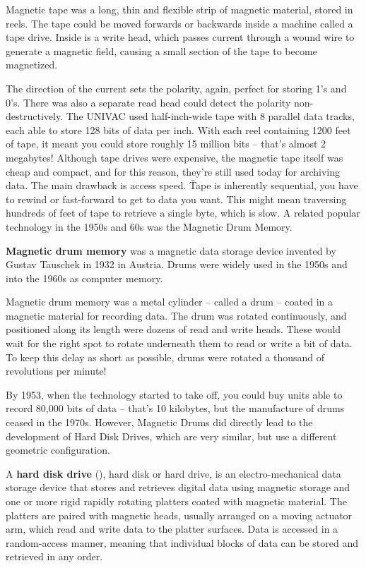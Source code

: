 Magnetic tape was a long, thin and flexible strip of magnetic material, stored in reels. The tape could be moved
forwards or backwards inside a machine called a tape drive. Inside is a write head, which passes current through a
wound wire to generate a magnetic field, causing a small section of the tape to become magnetized.


The direction of the current sets the polarity, again, perfect for storing 1's and 0's. There was also a separate
read head could detect the polarity non-destructively. The UNIVAC used half-inch-wide tape with 8 parallel data
tracks, each able to store 128 bits of data per inch. With each reel containing 1200 feet of tape, it meant you could
store roughly 15 million bits – that's almost 2 megabytes! Although tape drives were expensive, the magnetic tape
itself was cheap and compact, and for this reason, they're still used today for archiving data. The main drawback is
access speed. \v

Tape is inherently sequential, you have to rewind or fast-forward to get to data you want. This might mean traversing
hundreds of feet of tape to retrieve a single byte, which is slow. A related popular technology in the 1950s and 60s
was the Magnetic Drum Memory.

\textbf{Magnetic drum memory} was a magnetic data storage device invented by Gustav Tauschek in 1932 in Austria.
Drums were widely used in the 1950s and into the 1960s as computer memory.
\ed

Magnetic drum memory was a metal cylinder – called a drum – coated in a magnetic material for recording data. The
drum was rotated continuously, and positioned along its length were dozens of read and write heads. These would wait
for the right spot to rotate underneath them to read or write a bit of data. To keep this delay as short as possible,
drums were rotated a thousand of revolutions per minute!


By 1953, when the technology started to take off, you could buy units able to record 80,000 bits of data – that's 10
kilobytes, but the manufacture of drums ceased in the 1970s. However, Magnetic Drums did directly lead to the
development of Hard Disk Drives, which are very similar, but use a different geometric configuration.

A \textbf{hard disk drive} (\textbf{}), hard disk or hard drive, is an electro-mechanical data storage device that
stores and retrieves digital data using magnetic storage and one or more rigid rapidly rotating platters coated with
magnetic material. The platters are paired with magnetic heads, usually arranged on a moving actuator arm, which read
and write data to the platter surfaces. Data is accessed in a random-access manner, meaning that individual blocks of
data can be stored and retrieved in any order.
\ed

